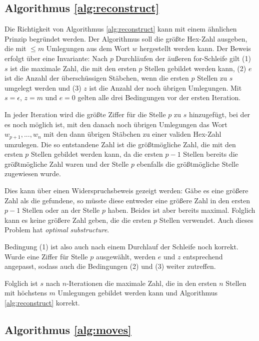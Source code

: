\documentclass[a4paper,10pt,ngerman]{scrartcl}
\begin{document}
\subsection{Algorithmus \ref*{alg:reconstruct}}
Die Richtigkeit von Algorithmus \ref{alg:reconstruct} kann mit einem ähnlichen Prinzip begründet werden. 
Der Algorithmus soll die größte Hex-Zahl ausgeben, die mit $\leq m$ Umlegungen aus dem Wort $w$ hergestellt werden kann.
Der Beweis erfolgt über eine Invariante: Nach $p$ Durchläufen der äußeren for-Schleife gilt (1) $s$ ist die maximale Zahl, die mit den ersten $p$ Stellen gebildet werden kann, (2) $e$ ist die Anzahl der überschüssigen Stäbchen, wenn die ersten $p$ Stellen zu $s$ umgelegt werden und (3) $z$ ist die Anzahl der noch übrigen Umlegungen.
Mit $s = \epsilon$, $z = m$ und $e = 0$ gelten alle drei Bedingungen vor der ersten Iteration.

In jeder Iteration wird die größte Ziffer für die Stelle $p$ zu $s$ hinzugefügt, bei der es noch möglich ist, mit den danach noch übrigen Umlegungen das Wort $w_{p+1}, ..., w_n$ mit den dann übrigen Stäbchen zu einer validen Hex-Zahl umzulegen. 
Die so entstandene Zahl ist die größtmögliche Zahl, die mit den ersten $p$ Stellen gebildet werden kann, da die ersten $p-1$ Stellen bereits die größtmögliche Zahl waren und der Stelle $p$ ebenfalls die größtmögliche Stelle zugewiesen wurde. 

Dies kann über einen Widerspruchsbeweis gezeigt werden: Gäbe es eine größere Zahl als die gefundene, so müsste diese entweder eine größere Zahl in den ersten $p-1$ Stellen oder an der Stelle $p$ haben. Beides ist aber bereits maximal. Folglich kann es keine größere Zahl geben, die die ersten $p$ Stellen verwendet. Auch dieses Problem hat \textit{optimal substructure}.

Bedingung (1) ist also auch nach einem Durchlauf der Schleife noch korrekt. Wurde eine Ziffer für Stelle $p$ ausgewählt, werden $e$ und $z$ entsprechend angepasst, sodass auch die Bedingungen (2) und (3) weiter zutreffen. 

Folglich ist $s$ nach $n$-Iterationen die maximale Zahl, die in den ersten $n$ Stellen mit höchstens $m$ Umlegungen gebildet werden kann und Algorithmus \ref{alg:reconstruct} korrekt.

\subsection{Algorithmus \ref*{alg:moves}}
\end{document}
